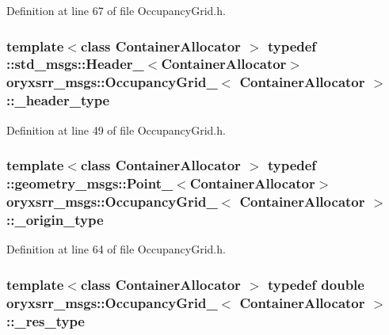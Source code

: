 \-Definition at line 67 of file \-Occupancy\-Grid.\-h.

\subsubsection[{\-\_\-header\-\_\-type}]{\setlength{\rightskip}{0pt plus 5cm}template$<$class Container\-Allocator $>$ typedef \-::std\-\_\-msgs\-::\-Header\-\_\-$<$\-Container\-Allocator$>$ {\bf oryxsrr\-\_\-msgs\-::\-Occupancy\-Grid\-\_\-}$<$ \-Container\-Allocator $>$\-::{\bf \-\_\-header\-\_\-type}}\label{structoryxsrr__msgs_1_1OccupancyGrid___a10ae64f88e7596bf0db3d07584862a43}


\-Definition at line 49 of file \-Occupancy\-Grid.\-h.

\subsubsection[{\-\_\-origin\-\_\-type}]{\setlength{\rightskip}{0pt plus 5cm}template$<$class Container\-Allocator $>$ typedef \-::geometry\-\_\-msgs\-::\-Point\-\_\-$<$\-Container\-Allocator$>$ {\bf oryxsrr\-\_\-msgs\-::\-Occupancy\-Grid\-\_\-}$<$ \-Container\-Allocator $>$\-::{\bf \-\_\-origin\-\_\-type}}\label{structoryxsrr__msgs_1_1OccupancyGrid___ad792aef0b9fd78999ef4c467f19cdb19}


\-Definition at line 64 of file \-Occupancy\-Grid.\-h.

\subsubsection[{\-\_\-res\-\_\-type}]{\setlength{\rightskip}{0pt plus 5cm}template$<$class Container\-Allocator $>$ typedef double {\bf oryxsrr\-\_\-msgs\-::\-Occupancy\-Grid\-\_\-}$<$ \-Container\-Allocator $>$\-::{\bf \-\_\-res\-\_\-type}}\label{structoryxsrr__msgs_1_1OccupancyGrid___a7a2907bc673c9d6cb8a05e0b509c5f5f}



